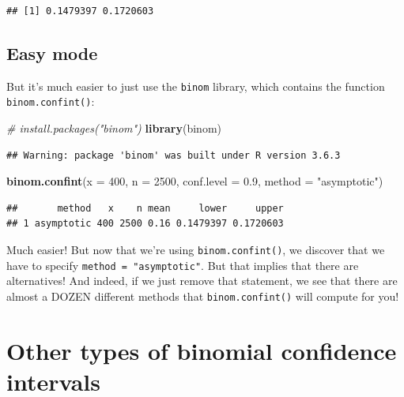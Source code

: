\documentclass[
]{book}
\newenvironment{Shaded}{\begin{snugshade}}{\end{snugshade}}
\newcommand{\CommentTok}[1]{\textcolor[rgb]{0.56,0.35,0.01}{\textit{#1}}}
\newcommand{\DataTypeTok}[1]{\textcolor[rgb]{0.13,0.29,0.53}{#1}}
\newcommand{\DecValTok}[1]{\textcolor[rgb]{0.00,0.00,0.81}{#1}}
\newcommand{\FloatTok}[1]{\textcolor[rgb]{0.00,0.00,0.81}{#1}}
\newcommand{\KeywordTok}[1]{\textcolor[rgb]{0.13,0.29,0.53}{\textbf{#1}}}
\newcommand{\NormalTok}[1]{#1}
\newcommand{\StringTok}[1]{\textcolor[rgb]{0.31,0.60,0.02}{#1}}
\theoremstyle{definition}
\theoremstyle{definition}
\theoremstyle{definition}
\theoremstyle{remark}
\begin{document}
\begin{verbatim}
## [1] 0.1479397 0.1720603
\end{verbatim}

\hypertarget{easy-mode}{%
\subsection{Easy mode}\label{easy-mode}}

But it's much easier to just use the \texttt{binom} library, which contains the function \texttt{binom.confint()}:

\begin{Shaded}
\begin{Highlighting}[]
\CommentTok{# install.packages("binom")}
\KeywordTok{library}\NormalTok{(binom)}
\end{Highlighting}
\end{Shaded}

\begin{verbatim}
## Warning: package 'binom' was built under R version 3.6.3
\end{verbatim}

\begin{Shaded}
\begin{Highlighting}[]
\KeywordTok{binom.confint}\NormalTok{(}\DataTypeTok{x =} \DecValTok{400}\NormalTok{, }\DataTypeTok{n =} \DecValTok{2500}\NormalTok{, }\DataTypeTok{conf.level =} \FloatTok{0.9}\NormalTok{, }\DataTypeTok{method =} \StringTok{"asymptotic"}\NormalTok{)}
\end{Highlighting}
\end{Shaded}

\begin{verbatim}
##       method   x    n mean     lower     upper
## 1 asymptotic 400 2500 0.16 0.1479397 0.1720603
\end{verbatim}

Much easier! But now that we're using \texttt{binom.confint()}, we discover that we have to specify \texttt{method\ =\ "asymptotic"}. But that implies that there are alternatives! And indeed, if we just remove that statement, we see that there are almost a DOZEN different methods that \texttt{binom.confint()} will compute for you!

\hypertarget{other-types-of-binomial-confidence-intervals}{%
\section{Other types of binomial confidence intervals}\label{other-types-of-binomial-confidence-intervals}}
\end{document}
